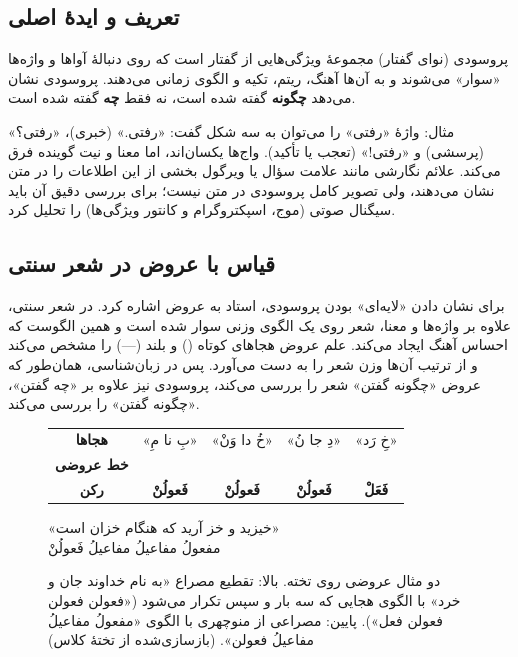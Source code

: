 \subsection{تعریف و ایدهٔ اصلی}
\begin{definitionbox}{پروسودی (نوای گفتار)}
 مجموعهٔ ویژگی‌هایی از گفتار است که روی دنبالهٔ آواها و واژه‌ها «سوار» می‌شوند و به آن‌ها آهنگ، ریتم، تکیه و الگوی زمانی می‌دهند. پروسودی نشان می‌دهد \textbf{چگونه} گفته شده است، نه فقط \textbf{چه} گفته شده است.
\end{definitionbox}

مثال: واژهٔ «رفتی» را می‌توان به سه شکل گفت: «رفتی.» (خبری)، «رفتی؟» (پرسشی) و «رفتی!» (تعجب یا تأکید). واج‌ها یکسان‌اند، اما معنا و نیت گوینده فرق می‌کند. علائم نگارشی مانند علامت سؤال یا ویرگول بخشی از این اطلاعات را در متن نشان می‌دهند، ولی تصویر کامل پروسودی در متن نیست؛ برای بررسی دقیق آن باید سیگنال صوتی (موج، اسپکتروگرام و کانتور ویژگی‌ها) را تحلیل کرد.

\subsection{قیاس با عروض در شعر سنتی}
برای نشان دادن «لایه‌ای» بودن پروسودی، استاد به عروض اشاره کرد. در شعر سنتی، علاوه بر واژه‌ها و معنا، شعر روی یک الگوی وزنی سوار شده است و همین الگوست که احساس آهنگ ایجاد می‌کند. علم عروض هجاهای کوتاه (\eng{$\smile$}) و بلند (—) را مشخص می‌کند و از ترتیب آن‌ها وزن شعر را به دست می‌آورد. پس در زبان‌شناسی، همان‌طور که عروض «چگونه گفتن» شعر را بررسی می‌کند، پروسودی نیز علاوه بر «چه گفتن»، «چگونه گفتن» را بررسی می‌کند.

\begin{figure}[htbp]
\centering
\begin{tabular}{c|c|c|c|c}
\toprule
\textbf{هجاها} & «بِ نا مِ» & «خُ دا وَنْ» & «دِ جا نُ» & «خِ رَد» \\
\textbf{خط عروضی} & \eng{$\smile$\;—\;—} & \eng{$\smile$\;—\;—} & \eng{$\smile$\;—\;—} & \eng{$\smile$\;—} \\
\textbf{رکن} & \textbf{فَعولُنْ} & \textbf{فَعولُنْ} & \textbf{فَعولُنْ} & \textbf{فَعَلْ} \\
\bottomrule
\end{tabular}

\bigskip
{\large «خیزید و خز آرید که هنگام خزان است»}\\[3pt]
{\large مفعولُ \quad مفاعیلُ \quad مفاعیلُ \quad فَعولُنْ}
\caption{دو مثال عروضی روی تخته. بالا: تقطیع مصراع «به نام خداوند جان و خرد» با الگوی هجایی  که سه بار و سپس  تکرار می‌شود («فعولن فعولن فعولن فعل»). پایین: مصراعی از منوچهری با الگوی «مفعولُ مفاعیلُ مفاعیلُ فعولن». (بازسازی‌شده از تختهٔ کلاس)}
\end{figure}


